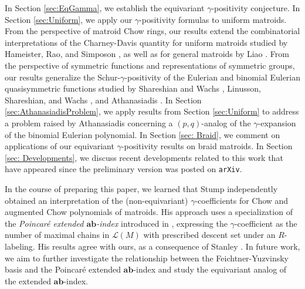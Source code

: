 \documentclass[reqno]{amsart}
\renewcommand{\L}{{\mathcal{L}}}
\theoremstyle{definition}
\theoremstyle{remark}
\begin{document}
In Section \ref{sec:EqGamma}, we establish the equivariant $\gamma$-positivity conjecture. In Section \ref{sec:Uniform}, we apply our $\gamma$-positivity formulas to uniform matroids. 
From the perspective of matroid Chow rings, our results extend the combinatorial interpretations of the Charney-Davis quantity for uniform matroids studied by Hameister, Rao, and Simposon \cite{HameisterRaoSimpson2021}, as well as for general matroids by Liao \cite{Liao2023Two}. 
From the perspective of symmetric functions and representations of symmetric groups, our results generalize the Schur-$\gamma$-positivity of the Eulerian and binomial Eulerian quasisymmetric functions studied by Shareshian and Wachs \cite{ShareshianWachs2010, ShareshianWachs2020}, Linusson, Shareshian, and Wachs \cite{LinussonShareshianWachs2012}, and Athanasiadis \cite{AthanasiadisGamma}. 
In Section \ref{sec:AthanasiadisProblem}, we apply results from Section \ref{sec:Uniform} to address a problem raised by Athanasiadis \cite[Problem 2.5]{AthanasiadisGamma} concerning a $(p,q)$-analog of the $\gamma$-expansion of the binomial Eulerian polynomial. 
In Section \ref{sec: Braid}, we comment on applications of our equivariant $\gamma$-positivity results on braid matroids.
In Section \ref{sec: Developments}, we discuss recent developments related to this work that have appeared since the preliminary version was posted on \texttt{arXiv}.

In the course of preparing this paper, we learned that Stump \cite{StumpChow2024} independently obtained an interpretation of the (non-equivariant) $\gamma$-coefficients for Chow and augmented Chow polynomials of matroids. His approach uses a specialization of the \emph{Poincar\'{e} extended $\mathbf{ab}$-index} introduced in \cite{DorpalenMaglioneStump2023ab}, expressing the $\gamma$-coefficient as the number of maximal chains in $\L(M)$ with prescribed descent set under an $R$-labeling. His results agree with ours, as a consequence of Stanley \cite[Theorem 3.1]{StanleyRlabel1974}. 
In future work, we aim to further investigate the relationship between the Feichtner-Yuzvinsky basis and the Poincar\'{e} extended $\mathbf{ab}$-index and study the equivariant analog of the extended $\mathbf{ab}$-index. 
\end{document}
